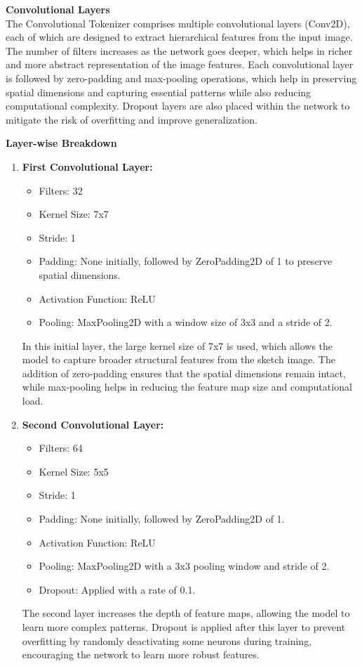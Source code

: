 \textbf{Convolutional Layers}\\
The Convolutional Tokenizer comprises multiple convolutional layers (Conv2D), each of which are designed to extract hierarchical features from the input image. The number of filters increases as the network goes deeper, which helps in richer and more abstract representation of the image features. Each convolutional layer is followed by zero-padding and max-pooling operations, which help in preserving spatial dimensions and capturing essential patterns while also reducing computational complexity. Dropout layers are also placed within the network to mitigate the risk of overfitting and improve generalization.

\textbf{Layer-wise Breakdown}
\begin{enumerate}[label=\textbf{\roman*})]
    \item \textbf{First Convolutional Layer:}
    \begin{itemize}
        \item Filters: 32
        \item Kernel Size: 7x7
        \item Stride: 1
        \item Padding: None initially, followed by ZeroPadding2D of 1 to preserve spatial dimensions.
        \item Activation Function: ReLU
        \item Pooling: MaxPooling2D with a window size of 3x3 and a stride of 2.
    \end{itemize}
    In this initial layer, the large kernel size of 7x7 is used, which allows the model to capture broader structural features from the sketch image. The addition of zero-padding ensures that the spatial dimensions remain intact, while max-pooling helps in reducing the feature map size and computational load.

    \item \textbf{Second Convolutional Layer:}
    \begin{itemize}
        \item Filters: 64
        \item Kernel Size: 5x5
        \item Stride: 1
        \item Padding: None initially, followed by ZeroPadding2D of 1.
        \item Activation Function: ReLU
        \item Pooling: MaxPooling2D with a 3x3 pooling window and stride of 2.
        \item Dropout: Applied with a rate of 0.1.
    \end{itemize}
    The second layer increases the depth of feature maps, allowing the model to learn more complex patterns. Dropout is applied after this layer to prevent overfitting by randomly deactivating some neurons during training, encouraging the network to learn more robust features.


\end{enumerate}
